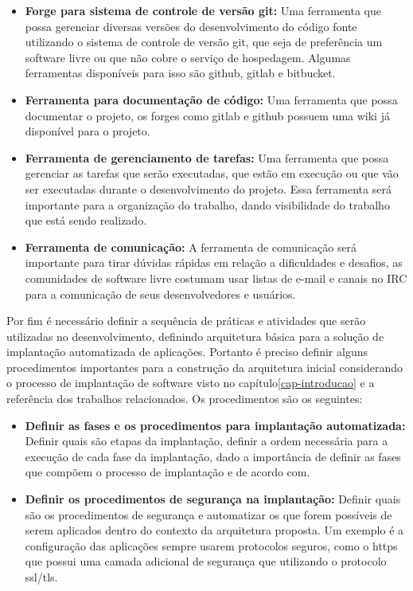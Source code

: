 \begin{itemize}
  \item \textbf{Forge para sistema de controle de versão git:} Uma ferramenta que
  possa gerenciar diversas versões do desenvolvimento do código fonte utilizando
  o sistema de controle de versão git, que seja de preferência um software livre
  ou que não cobre o serviço de hospedagem. Algumas ferramentas disponíveis para
  isso são github, gitlab e bitbucket.
  \item \textbf{Ferramenta para documentação de código:} Uma ferramenta que possa
  documentar o projeto, os forges como gitlab e github possuem uma wiki já disponível
  para o projeto.
  \item \textbf{Ferramenta de gerenciamento de tarefas:} Uma ferramenta que possa
  gerenciar as tarefas que serão executadas, que estão em execução ou que vão ser executadas
  durante o desenvolvimento do projeto. Essa ferramenta será importante para a
  organização do trabalho, dando visibilidade do trabalho que está sendo realizado.
  \item \textbf{Ferramenta de comunicação:} A ferramenta de comunicação será
  importante para tirar dúvidas rápidas em relação a dificuldades e desafios, as
  comunidades de software livre costumam usar listas de e-mail e canais no IRC
  para a comunicação de seus desenvolvedores e usuários.
\end{itemize}

Por fim é necessário definir a sequência de práticas e atividades que serão
utilizadas no desenvolvimento, definindo arquitetura básica para a solução de
implantação automatizada de aplicações. Portanto é preciso definir alguns
procedimentos importantes para a construção da arquitetura inicial considerando
o processo de implantação de software visto no capítulo\ref{cap-introducao}
e a referência dos trabalhos relacionados. Os procedimentos são os seguintes:

\begin{itemize}
  \item  \textbf{Definir as fases e os procedimentos para implantação automatizada:}
   Definir quais são etapas da implantação, definir a ordem necessária para a execução de
  cada fase da implantação, dado a importância de definir as fases que compõem o processo de
  implantação e de acordo com\cite{omg2006}.
  \item  \textbf{Definir os procedimentos de segurança na implantação:} Definir
  quais são os procedimentos de segurança e automatizar os que forem possíveis
  de serem aplicados dentro do contexto da arquitetura proposta. Um exemplo
  é a configuração das aplicações sempre usarem protocolos seguros, como o https
  que possui uma camada adicional de segurança que utilizando o protocolo ssl/tls.
\end{itemize}

